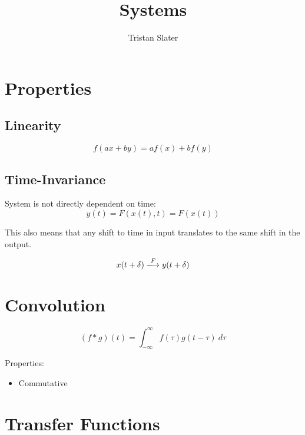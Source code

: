 \documentclass{article}
\title{Systems}
\author{Tristan Slater}
\begin{document}
    \maketitle

    \section{Properties}

    \subsection{Linearity}

    \begin{equation}
        f(ax + by) = af(x) + bf(y)
    \end{equation}

    \subsection{Time-Invariance}

    System is not directly dependent on time: \begin{equation}
        y(t) = F(x(t), t) = F(x(t))
    \end{equation}

    This also means that any shift to time in input translates to the same shift in the output.

    \begin{equation}
        x(t + \delta) \xlongrightarrow{F} y(t + \delta)
    \end{equation}

    \section{Convolution}

    \begin{equation}
        (f * g)(t) = \int_{-\infty}^\infty{f(\tau)g(t - \tau)\ d\tau}
    \end{equation}

    Properties: \begin{itemize}
        \item Commutative
    \end{itemize}

    \section{Transfer Functions}
\end{document}
